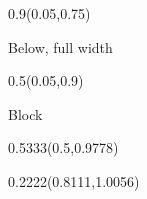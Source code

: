 \documentclass{beamer}
\begin{document}
{\begin{frame}[plain,t]
\begin{textblock}{0.9}(0.05,0.75)
{\raggedright\fontsize{20}{24}\selectfont Below, full width\par}
\end{textblock}

\begin{textblock}{0.5}(0.05,0.9)
{\begin{block}{}\raggedright\fontsize{20}{24}\selectfont Block\end{block}\par}
\end{textblock}

\begin{textblock}{0.5333}(0.5,0.9778)
\raggedleft{\insertslidenavigationsymbol\insertframenavigationsymbol\insertsubsectionnavigationsymbol\insertsectionnavigationsymbol\insertdocnavigationsymbol\insertbackfindforwardnavigationsymbol}
\end{textblock}

\begin{textblock}{0.2222}(0.8111,1.0056)
\raggedleft{\small\color{black!55}\insertframenumber\,/\,\inserttotalframenumber}
\end{textblock}
\end{frame}
}
\end{document}
